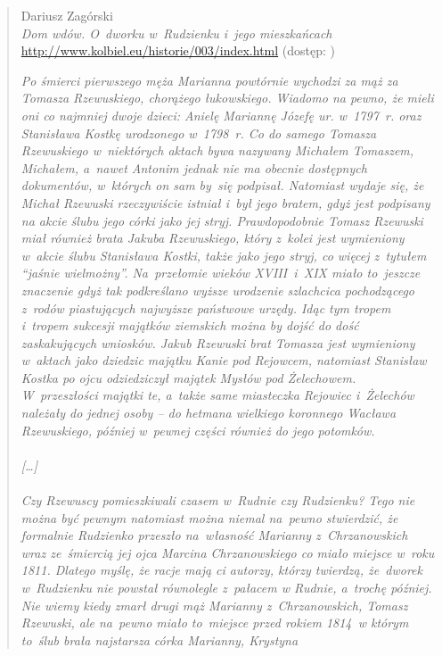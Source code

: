 \begin{quote}{Dariusz Zagórski \\ \null\hfill \emph{Dom wdów. O~dworku 
    w~Rudzienku i~jego mieszkańcach} \\ \null\hfill 
    \url{http://www.kolbiel.eu/historie/003/index.html} (dostęp: \miesiacrokdwa)}

\textit{Po śmierci pierwszego męża Marianna powtórnie wychodzi za mąż za 
Tomasza Rzewuskiego, chorążego łukowskiego. Wiadomo na pewno, że mieli oni co 
najmniej dwoje dzieci: Anielę Mariannę Józefę ur. w~1797~r. oraz Stanisława 
Kostkę urodzonego w~1798~r. Co do samego Tomasza Rzewuskiego w~niektórych 
aktach bywa nazywany Michałem Tomaszem, Michałem, a~nawet Antonim jednak nie 
ma obecnie dostępnych dokumentów, w~których on sam by~się podpisał. Natomiast 
wydaje się, że Michał Rzewuski rzeczywiście istniał i~był jego bratem, gdyż 
jest podpisany na akcie ślubu jego córki jako jej stryj. Prawdopodobnie 
Tomasz Rzewuski miał również brata Jakuba Rzewuskiego, który z~kolei jest 
wymieniony w~akcie ślubu Stanisława Kostki, także jako jego stryj, co więcej 
z~tytułem \enquote{jaśnie wielmożny}. Na~przełomie wieków XVIII~i~XIX miało 
to~jeszcze znaczenie gdyż tak podkreślano wyższe urodzenie szlachcica 
pochodzącego z~rodów piastujących najwyższe państwowe urzędy. Idąc tym tropem 
i~tropem sukcesji majątków ziemskich można by dojść do dość zaskakujących 
wniosków. Jakub Rzewuski brat Tomasza jest wymieniony w~aktach jako dziedzic 
majątku Kanie pod Rejowcem, natomiast Stanisław Kostka po ojcu odziedziczył 
majątek Mysłów pod Żelechowem. W~przeszłości majątki te, a~także same 
miasteczka Rejowiec i~Żelechów należały do jednej osoby – do hetmana 
wielkiego koronnego Wacława Rzewuskiego, później w~pewnej części również do 
jego potomków.
\\
\\
{[}\dots{]}
\\
\\
Czy Rzewuscy pomieszkiwali czasem w~Rudnie czy Rudzienku? Tego nie można być 
pewnym natomiast można niemal na~pewno stwierdzić, że formalnie Rudzienko 
przeszło na~własność Marianny z~Chrzanowskich wraz ze~śmiercią jej ojca 
Marcina Chrzanowskiego co miało miejsce w~roku 1811. Dlatego myślę, że racje 
mają ci autorzy, którzy twierdzą, że~dworek w~Rudzienku nie powstał 
równolegle z~pałacem w Rudnie, a~trochę później. Nie wiemy kiedy zmarł drugi 
mąż Marianny z~Chrzanowskich, Tomasz Rzewuski, ale na~pewno miało to~miejsce 
przed rokiem 1814~w którym to~ślub brała najstarsza córka Marianny, Krystyna 
}
\end{quote}

